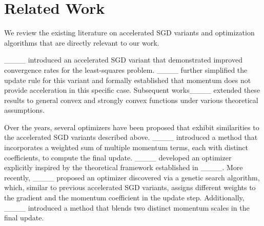 \section{Related Work}
We review the existing literature on accelerated SGD variants and optimization algorithms that are directly relevant to our work.

____ introduced an accelerated SGD variant that demonstrated improved convergence rates for the least-squares problem. ____ further simplified the update rule for this variant and formally established that momentum does not provide acceleration in this specific case. Subsequent works____ extended these results to general convex and strongly convex functions under various theoretical assumptions.

Over the years, several optimizers have been proposed that exhibit similarities to the accelerated SGD variants described above. ____ introduced a method that incorporates a weighted sum of multiple momentum terms, each with distinct coefficients, to compute the final update. ____ developed an optimizer explicitly inspired by the theoretical framework established in ____. More recently, ____ proposed an optimizer discovered via a genetic search algorithm, which, similar to previous accelerated SGD variants, assigns different weights to the gradient and the momentum coefficient in the update step. Additionally, ____ introduced a method that blends two distinct momentum scales in the final update.